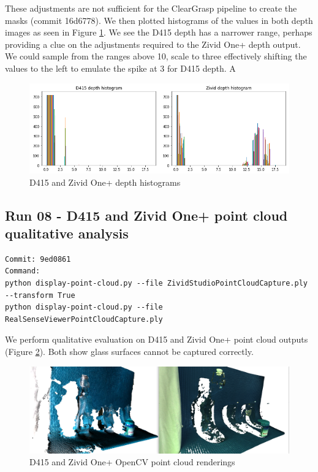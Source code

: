 These adjustments are not sufficient for the ClearGrasp pipeline to create the masks (commit 16d6778). We then plotted histograms of the values in both depth images as seen in Figure \ref{fig:Depth-Histograms}. We see the D415 depth has a narrower range, perhaps providing a clue on the adjustments required to the Zivid One+ depth output. We could sample from the ranges above 10, scale to three effectively shifting the values to the left to emulate the spike at 3 for D415 depth. A

\begin{figure}[h!]
\centering
\includegraphics[width=\textwidth]{Figures/Depth-Histograms.png}
\caption{D415 and Zivid One+ depth histograms}
\label{fig:Depth-Histograms}
\end{figure}


\subsection{Run 08 -  D415 and Zivid One+ point cloud qualitative analysis}
\label{app_res:08}
\begin{verbatim}
Commit: 9ed0861
Command: 
python display-point-cloud.py --file ZividStudioPointCloudCapture.ply --transform True
python display-point-cloud.py --file RealSenseViewerPointCloudCapture.ply
\end{verbatim}

We perform qualitative evaluation on D415 and Zivid One+ point cloud outputs (Figure \ref{fig:OpenCV-D415-Zivid-Point-Cloud}). Both show glass surfaces cannot be captured correctly. 

\begin{figure}[h!]
\centering
\includegraphics[width=\textwidth]{Figures/OpenCV-D415-Zivid-Point-Cloud.png}
\caption{D415 and Zivid One+ OpenCV point cloud renderings}
\label{fig:OpenCV-D415-Zivid-Point-Cloud}
\end{figure}

